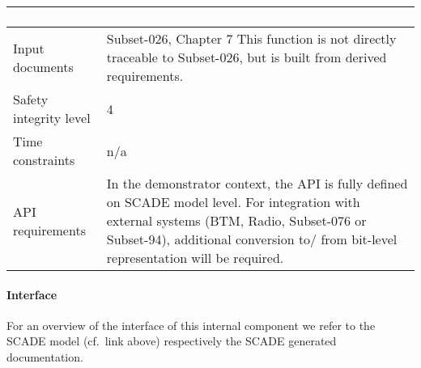 \begin{longtable}{p{}p{}}
\begin{enumerate}
\end{enumerate}
\\
\midrule
Input documents	& 
Subset-026, Chapter 7\newline
This function is not directly traceable to Subset-026, but is built from derived requirements.\\
\midrule
Safety integrity level		& 4 \\
\midrule
Time constraints		& n/a  \\
\midrule
API requirements 		& In the demonstrator context, the API is fully defined on SCADE model level. For integration with external systems (BTM, Radio, Subset-076 or Subset-94), additional conversion to/ from bit-level representation will be required.\\
\bottomrule
\end{longtable}

\paragraph{Interface}
For an overview of the interface of this internal component we refer to the SCADE model (cf.~link above) respectively the SCADE generated documentation.

